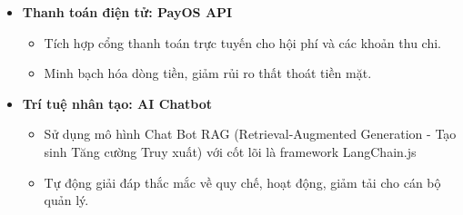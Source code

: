\begin{itemize}
\item \textbf{Thanh toán điện tử: PayOS API}
\begin{itemize}
    \item Tích hợp cổng thanh toán trực tuyến cho hội phí và các khoản thu chi.
    \item Minh bạch hóa dòng tiền, giảm rủi ro thất thoát tiền mặt.
\end{itemize}

\item \textbf{Trí tuệ nhân tạo: AI Chatbot}
\begin{itemize}
    \item Sử dụng mô hình Chat Bot RAG (Retrieval-Augmented Generation - Tạo sinh Tăng cường Truy xuất) với cốt lõi là framework LangChain.js
    \item Tự động giải đáp thắc mắc về quy chế, hoạt động, giảm tải cho cán bộ quản lý.
\end{itemize}
\end{itemize}